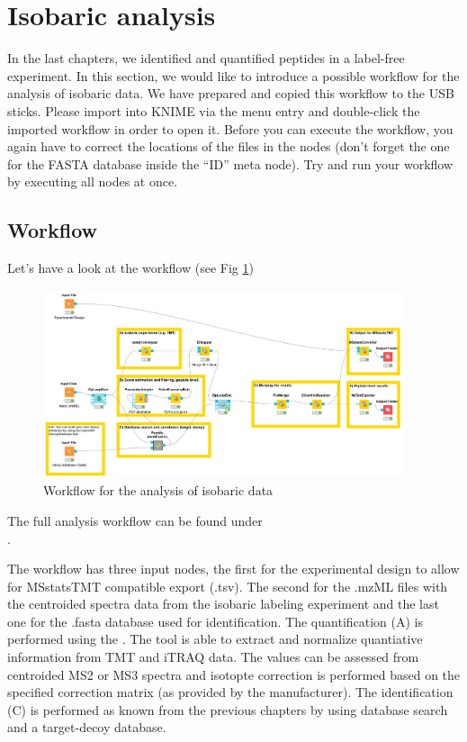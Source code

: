 

\newpage
\section{Isobaric analysis}
In the last chapters, we identified and quantified peptides in a label-free experiment. In this section, we would like to introduce a possible workflow for the analysis of isobaric data. We have prepared and copied this workflow to the USB sticks. Please import  into KNIME via the menu entry  and double-click the imported workflow in order to open it. Before you can execute the workflow, you again have to correct the locations of the files in the  nodes (don't forget the one for the FASTA database inside the ``ID'' meta node). Try and run your workflow by executing all nodes at once.

\subsection{Workflow}
Let's have a look at the workflow (see Fig \ref{fig:isobaric_wf})

\begin{figure}[htbp]
  \centering
  \includegraphics[width=0.95\textwidth]{graphics/isobaric/MSstatsTMT_export.png}
  \caption{Workflow for the analysis of isobaric data}
  \label{fig:isobaric_wf}
\end{figure}

\noindent The full analysis workflow can be found under\\
.

The workflow has three input nodes, the first for the experimental design to allow for MSstatsTMT compatible export (.tsv). The second for the .mzML files with the centroided spectra data from the isobaric labeling experiment and the last one for the .fasta database used for identification. The quantification (A) is performed using the . The tool is able to extract and normalize quantiative information from TMT and iTRAQ data. The values can be assessed from centroided MS2 or MS3 spectra and isotopte correction is performed based on the specified correction matrix (as provided by the manufacturer). The identification (C) is performed as known from the previous chapters by using database search and a target-decoy database.

